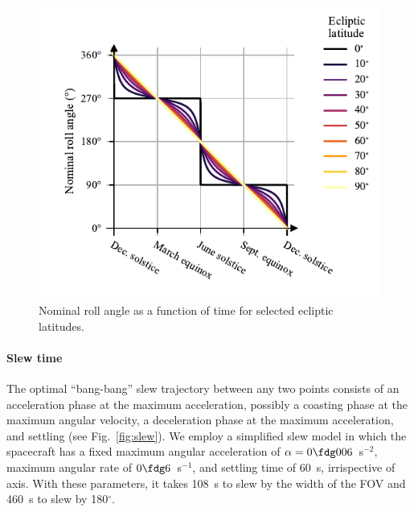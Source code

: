\documentclass[twocolumn,times]{aastex631}
\begin{document}
\begin{figure}
    \includegraphics[width=\columnwidth]{figures/nominal-roll}
    \caption{\label{fig:nominal-roll}Nominal roll angle as a function of time for selected ecliptic latitudes.}
\end{figure}

\paragraph{Slew time}
The optimal ``bang-bang'' slew trajectory between any two points consists of an acceleration phase at the maximum acceleration, possibly a coasting phase at the maximum angular velocity, a deceleration phase at the maximum acceleration, and settling (see Fig.~\ref{fig:slew}). We employ a simplified slew model in which the spacecraft has a fixed maximum angular acceleration of $\alpha=0 \fdg 006$~s$^{-2}$, maximum angular rate of $0 \fdg 6$~s$^{-1}$, and settling time of 60~s, irrispective of axis. With these parameters, it takes 108~s to slew by the width of the \ac{FOV} and 460~s to slew by 180$^\circ$.
\end{document}
